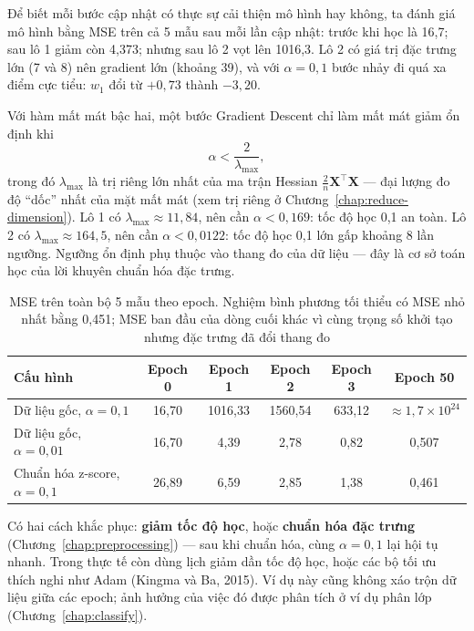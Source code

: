 Để biết mỗi bước cập nhật có thực sự cải thiện mô hình hay không, ta đánh giá mô hình bằng MSE trên cả 5 mẫu sau mỗi lần cập nhật: trước khi học là 16,7; sau lô 1 giảm còn 4,373; nhưng sau lô 2 vọt lên 1016,3. Lô 2 có giá trị đặc trưng lớn (7 và 8) nên gradient lớn (khoảng 39), và với $\alpha = 0{,}1$ bước nhảy đi quá xa điểm cực tiểu: $w_1$ đổi từ $+0{,}73$ thành $-3{,}20$.

Với hàm mất mát bậc hai, một bước Gradient Descent chỉ làm mất mát giảm ổn định khi
\begin{equation}
    \alpha < \frac{2}{\lambda_{\max}},
\end{equation}
trong đó $\lambda_{\max}$ là trị riêng lớn nhất của ma trận Hessian $\frac{2}{n}\mathbf{X}^\top\mathbf{X}$ --- đại lượng đo độ ``dốc'' nhất của mặt mất mát (xem trị riêng ở Chương~\ref{chap:reduce-dimension}). Lô 1 có $\lambda_{\max} \approx 11{,}84$, nên cần $\alpha < 0{,}169$: tốc độ học 0,1 an toàn. Lô 2 có $\lambda_{\max} \approx 164{,}5$, nên cần $\alpha < 0{,}0122$: tốc độ học 0,1 lớn gấp khoảng 8 lần ngưỡng. Ngưỡng ổn định phụ thuộc vào thang đo của dữ liệu --- đây là cơ sở toán học của lời khuyên chuẩn hóa đặc trưng.

\begin{table}[H]
\centering
\begin{tabular}{|l|c|c|c|c|c|}
\hline
\textbf{Cấu hình} & \textbf{Epoch 0} & \textbf{Epoch 1} & \textbf{Epoch 2} & \textbf{Epoch 3} & \textbf{Epoch 50} \\
\hline
Dữ liệu gốc, $\alpha = 0{,}1$ & 16,70 & 1016,33 & 1560,54 & 633,12 & $\approx 1{,}7 \times 10^{24}$ \\ \hline
Dữ liệu gốc, $\alpha = 0{,}01$ & 16,70 & 4,39 & 2,78 & 0,82 & 0,507 \\ \hline
Chuẩn hóa z-score, $\alpha = 0{,}1$ & 26,89 & 6,59 & 2,85 & 1,38 & 0,461 \\ \hline
\end{tabular}
\caption{MSE trên toàn bộ 5 mẫu theo epoch. Nghiệm bình phương tối thiểu có MSE nhỏ nhất bằng 0,451; MSE ban đầu của dòng cuối khác vì cùng trọng số khởi tạo nhưng đặc trưng đã đổi thang đo}
\label{tab:minibatch-epochs}
\end{table}


Có hai cách khắc phục: \textbf{giảm tốc độ học}, hoặc \textbf{chuẩn hóa đặc trưng} (Chương~\ref{chap:preprocessing}) --- sau khi chuẩn hóa, cùng $\alpha = 0{,}1$ lại hội tụ nhanh. Trong thực tế còn dùng lịch giảm dần tốc độ học, hoặc các bộ tối ưu thích nghi như Adam (Kingma và Ba, 2015). Ví dụ này cũng không xáo trộn dữ liệu giữa các epoch; ảnh hưởng của việc đó được phân tích ở ví dụ phân lớp (Chương~\ref{chap:classify}).

